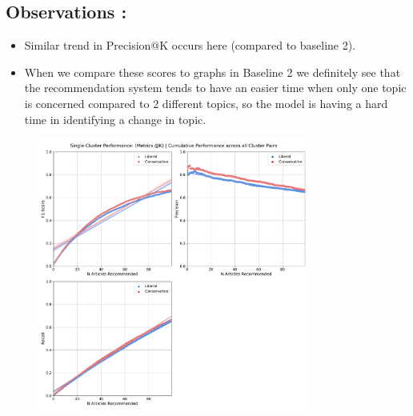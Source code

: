 \documentclass[a4paper,fontsize=9.0pt]{scrartcl}
\begin{document}
\subsection{Observations :}
\begin{flushleft}
\begin{itemize}
    \item Similar trend in Precision@K occurs here (compared to baseline 2). 
    \item  When we compare these scores to graphs in Baseline 2 we definitely see that the recommendation system tends to have an easier time when only one topic is concerned compared to 2 different topics, so the model is having a hard time in identifying a change in topic.
\end{itemize}
\end{flushleft}
\begin{figure}[H]
 \includegraphics[width=0.8\textwidth]{Graphs/user_interaction_vs_model_performance_cumu_single_cluster.pdf}
\end{figure}




\newpage
\end{document}
